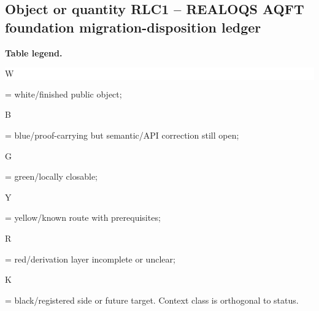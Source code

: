 \subsection*{Object or quantity RLC1 -- REALOQS AQFT foundation migration-disposition ledger}
\hypertarget{objproof:RLC1}{}
\par\smallskip\noindent\begin{minipage}{0.99\linewidth}\footnotesize\raggedright\textbf{Table legend.} \colorbox{white}{\strut W} = white/finished public object; \colorbox{cyan!20}{\strut B} = blue/proof-carrying but semantic/API correction still open; \colorbox{green!18}{\strut G} = green/locally closable; \colorbox{yellow!25}{\strut Y} = yellow/known route with prerequisites; \colorbox{red!20}{\strut R} = red/derivation layer incomplete or unclear; \colorbox{black!18}{\strut K} = black/registered side or future target. Context class is orthogonal to status.\end{minipage}\par\vspace{0.25em}
